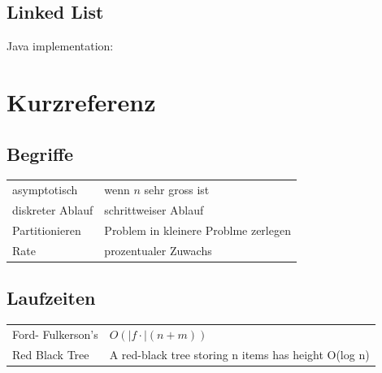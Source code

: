 \documentclass[a4paper,10pt]{report}
\begin{document}
 \section{Linked List}
 Java implementation:
 
 
 \chapter{Kurzreferenz}
 \section{Begriffe}
 \begin{tabularx}{\textwidth}{lX}
 asymptotisch & wenn $n$ sehr gross ist\\
 diskreter Ablauf & schrittweiser Ablauf\\
 Partitionieren & Problem in kleinere Problme zerlegen\\
 Rate & prozentualer Zuwachs
\end{tabularx}
\section{Laufzeiten}
\begin{tabularx}{\textwidth}{X|X}
Ford- Fulkerson's & $O(|f\cdot|(n + m))$\\
Red Black Tree & A red-black tree storing n items has height O(log n)
\end{tabularx}

 
\end{document}
